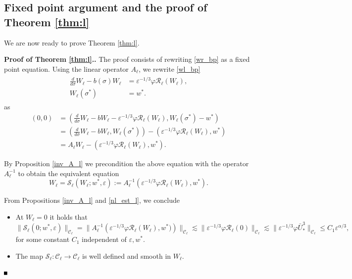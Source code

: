 \documentclass[letterpaper,11pt]{article}
\newcommand{\eps}{\varepsilon}
\newcommand{\lar}{ \lesssim }
\newcommand{\Ral}{\mathcal{R}}
\numberwithin{equation}{section}
\theoremstyle{plain}
\newenvironment{Proof}[1][\unskip]%
 {\begin{trivlist} \item[]{\bf Proof #1. }}%
 {\hspace*{\fill}$\rule{.4\baselineskip}{.4\baselineskip}$\end{trivlist}}
\begin{document}
\subsection{Fixed point argument and the proof of Theorem \ref{thm:l}}
We are now ready to prove Theorem \ref{thm:l}.
\begin{Proof}[ of Theorem \ref{thm:l}.]The proof consists of rewriting \eqref{wr_bp} as a fixed point equation. Using the linear operator $A_\ell$, we rewrite \eqref{wl_bp}
 \begin{align*}
\begin{split}
\frac{d}{d\sigma} W_\ell - b(\sigma)W_\ell &= \eps^{-1/3}\varphi \Ral_\ell(W_\ell),\\
W_\ell(\sigma^*) &= w^*.
\end{split}
\end{align*}
as
\begin{align*}
(0,0) &=\left( \frac{d}{d\sigma}W_\ell-b W_\ell - \eps^{-1/3}\varphi \Ral_\ell(W_\ell), W_\ell(\sigma^*)-w^* \right)\\
&=\left( \frac{d}{d\sigma}W_\ell-bW_\ell, W_\ell(\sigma^*) \right)- \left(\eps^{-1/3}\varphi \Ral_\ell(W_\ell), w^* \right)\\
&= A_\ell W_\ell - \left(\eps^{-1/3}\varphi \Ral_\ell(W_\ell), w^* \right).
\end{align*} 

By Proposition \ref{inv_A_l} we precondition the above equation with the operator $A_\ell^{-1}$ to obtain the equivalent equation
\begin{equation}\label{fix_pt:l}
 W_\ell = \mathcal{S}_\ell(W_\ell; w^*,\eps):= A_\ell^{-1}(\eps^{-1/3}\varphi \mathcal{R}_\ell(W_\ell), w^*).
\end{equation}

From Propositions \ref{inv_A_l} and \ref{nl_est_l}, we conclude 
\begin{itemize}
\item At $W_\ell =0 $ it holds that 
\[
\|\mathcal{S}_\ell(0; w^*,\eps) \|_{\mathcal{C}_\ell}= \|A_\ell^{-1}\left(\eps^{-1/3}\varphi \mathcal{R}_\ell(W_\ell),w^*)\right)\|_{\mathcal{C}_\ell}  \lar \|\eps^{-1/3}\varphi \Ral_\ell(0)\|_{\mathcal{C}_\ell} \lar \|\eps^{-1/3}\varphi \bar{U}_*^3 \|_{\mathcal{C}_\ell}\le C_1\eps^{\alpha/3},
\]
for some constant $C_1$ independent of $\eps,w^*$.

\item The map $\mathcal{S}_\ell: \mathcal{C}_\ell \to \mathcal{C}_\ell$ is well defined and smooth in $W_\ell$.


\end{itemize}
\end{Proof}
\end{document}
